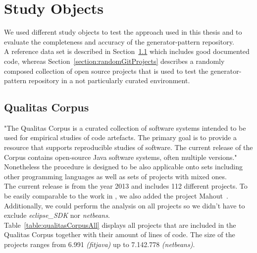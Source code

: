 \section{Study Objects}
We used different study objects to test the approach used in this thesis and to evaluate the completeness and accuracy of the generator-pattern repository. \\
A reference data set is described in Section~\ref{section:qualitasCorpus} which includes good documented code, whereas Section~\ref{section:randomGitProjects} describes a randomly composed collection of open source projects that is used to test the generator-pattern repository in a not particularly curated environment.
 
\subsection{Qualitas Corpus}
\label{section:qualitasCorpus}
"The Qualitas Corpus is a curated collection of software systems intended to be used for empirical studies of code artefacts. The primary goal is to provide a resource that supports reproducible studies of software. The current release of the Corpus contains open-source Java software systems, often multiple versions." \cite{TemperoEwanandAnslowCraigandDietrichJensandHanTedandLiJingandLumpeMarkusandMeltonHaydenandNoble2010a}\\
Nonetheless the procedure is designed to be also applicable onto sets including other programming languages as well as sets of projects with mixed ones.\\
The current release is from the year 2013 and includes 112 different projects. To be easily comparable to the work in \cite{Bernwieser2014}, we also added the project Mahout~\cite{ApacheSoftwareFoundation}.\\
Additionally, we could perform the analysis on all projects so we didn't have to exclude \textit{eclipse\_SDK} nor \textit{netbeans}.\\
Table~\ref{table:qualitasCorpusAll} displays all projects that are included in the Qualitas Corpus together with their amount of lines of code. The size of the projects ranges from 6.991 \textit{(fitjava)} up to 7.142.778 \textit{(netbeans)}.

%

